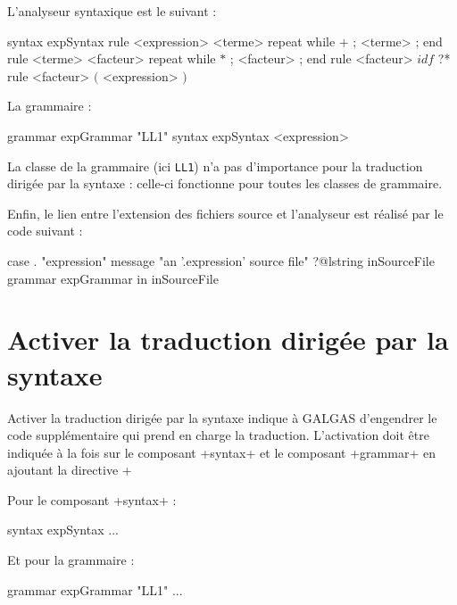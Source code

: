 L'analyseur syntaxique est le suivant :
\begin{galgascode}
syntax expSyntax {
  rule <expression> {
    <terme>
    repeat while $+$ ; <terme> ; end
  }
  rule <terme> {
    <facteur>
    repeat while $*$ ; <facteur> ; end
  }
  rule <facteur> {
    $idf$ ?*
  }
  rule <facteur> {
    $($
    <expression>
    $)$
  }
}
\end{galgascode}

La grammaire :
\begin{galgascode}
grammar expGrammar "LL1" {
  syntax expSyntax
  <expression>
}
\end{galgascode}

La classe de la grammaire (ici \texttt{LL1}) n'a pas d'importance pour la traduction dirigée par la syntaxe : celle-ci fonctionne pour toutes les classes de grammaire. 

Enfin, le lien entre l'extension des fichiers source et l'analyseur est réalisé par le code suivant :
\begin{galgascode}
case . "expression"
message "an '.expression' source file"
?@lstring inSourceFile {
  grammar expGrammar in inSourceFile
}
\end{galgascode}








\section{Activer la traduction dirigée par la syntaxe}

Activer la traduction dirigée par la syntaxe indique à GALGAS d'engendrer le code supplémentaire qui prend en charge la traduction. L'activation doit être indiquée à la fois sur le composant \ggs+syntax+ et le composant \ggs+grammar+ en ajoutant la directive \ggs+%

Pour le composant \ggs+syntax+ :
\begin{galgascode}
syntax expSyntax %
  ...
\end{galgascode}

Et pour la grammaire :
\begin{galgascode}
grammar expGrammar "LL1" %
  ...
\end{galgascode}


